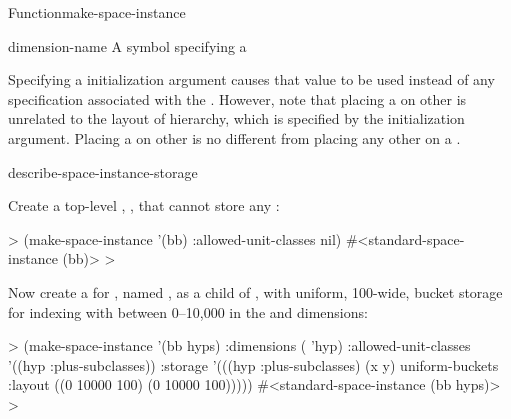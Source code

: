 \documentclass[10pt,twoside,english,pdftex]{article}
\begin{document}
\begin{functiondoc}{Function}{make-space-instance}
\fnterms
\begin{args}{dimension-name}
 A symbol specifying a  
\end{args}

\fndescription 
%
%
%
%
Specifying a  initialization argument causes
that value to be used instead of any 
specification associated with the .  However, note that
placing a  on other  is unrelated
to the layout of  hierarchy, which is specified
by the  initialization argument.  Placing a
 on other  is no different from
placing any other  on a .

\begin{alsos}{describe-space-instance-storage}
\also[children-of]
\also[dimensions-of]
\also[parent-of]
\end{alsos}

\fnexamples
Create a top-level , ,
that cannot store any :
%
\W\supp
\begin{example}
  > (make-space-instance '(bb) 
       :allowed-unit-classes nil)
  #<standard-space-instance (bb)>
  > 
\end{example}
%
%
%
Now create a  for  ,
named , as a child of , with uniform, 100-wide, bucket
storage for indexing  with 
between 0--10,000 in the  and  dimensions:
%
\W\supp\notpretop
\begin{example}
  > (make-space-instance '(bb hyps)
       :dimensions ( 'hyp)
       :allowed-unit-classes '((hyp :plus-subclasses))
       :storage '(((hyp :plus-subclasses) (x y) 
                   uniform-buckets :layout ((0 10000 100)
                                            (0 10000 100)))))
  #<standard-space-instance (bb hyps)>
  >
\end{example}


\end{functiondoc}
\end{document}
